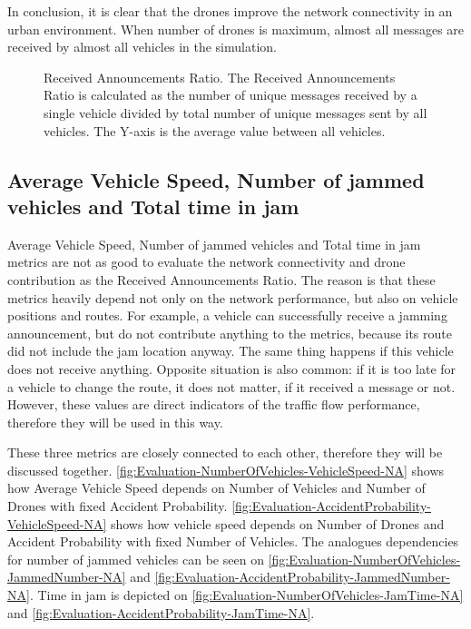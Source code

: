 \documentclass[]{nsm-thesis}
\begin{document}
In conclusion, it is clear that the drones improve the network connectivity in an urban environment. When number of drones is maximum, almost all messages are received by almost all vehicles in the simulation.

\begin{figure}%
	\centering
	\hfill
	\hfill
	\caption{Received Announcements Ratio. The Received Announcements Ratio is calculated as the number of unique messages received by a single vehicle divided by total number of unique messages sent by all vehicles. The Y-axis is the average value between all vehicles.}%
	\label{fig:Evaluation-ReceivedAnnouncements}%
\end{figure}



\subsection{Average Vehicle Speed, Number of jammed vehicles and Total time in jam}

Average Vehicle Speed, Number of jammed vehicles and Total time in jam metrics are not as good to evaluate the network connectivity and drone contribution as the Received Announcements Ratio. The reason is that these metrics heavily depend not only on the network performance, but also on vehicle positions and routes. For example, a vehicle can successfully receive a jamming announcement, but do not contribute anything to the metrics, because its route did not include the jam location anyway. The same thing happens if this vehicle does not receive anything. Opposite situation is also common: if it is too late for a vehicle to change the route, it does not matter, if it received a message or not. However, these values are direct indicators of the traffic flow performance, therefore they will be used in this way.

These three metrics are closely connected to each other, therefore they will be discussed together. \cref{fig:Evaluation-NumberOfVehicles-VehicleSpeed-NA} shows how Average Vehicle Speed depends on Number of Vehicles and Number of Drones with fixed Accident Probability. \cref{fig:Evaluation-AccidentProbability-VehicleSpeed-NA} shows how vehicle speed depends on Number of Drones and Accident Probability with fixed Number of Vehicles. The analogues dependencies for number of jammed vehicles can be seen on \cref{fig:Evaluation-NumberOfVehicles-JammedNumber-NA} and \cref{fig:Evaluation-AccidentProbability-JammedNumber-NA}. Time in jam is depicted on \cref{fig:Evaluation-NumberOfVehicles-JamTime-NA} and \cref{fig:Evaluation-AccidentProbability-JamTime-NA}.
\end{document}
